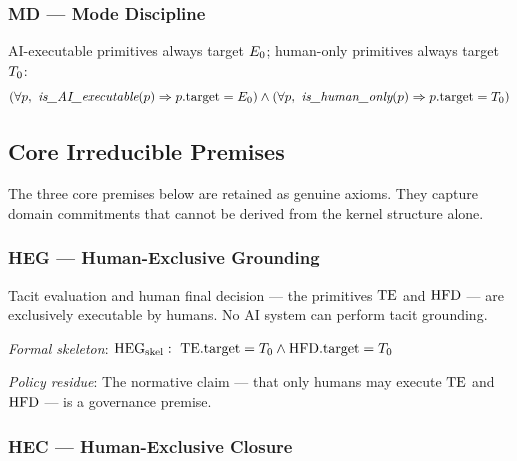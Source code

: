 \subsubsection*{MD --- Mode Discipline}

\begin{theorem}[MD is a theorem]
AI-executable primitives always target $E_0$; human-only primitives always
target $T_0$:
\[
  (\forall p,\ \textit{is\_AI\_executable}(p) \Rightarrow p.\mathrm{target} = E_0)
  \wedge
  (\forall p,\ \textit{is\_human\_only}(p) \Rightarrow p.\mathrm{target} = T_0)
\]
\end{theorem}

\subsection{Core Irreducible Premises}
\label{sec:core-irreducible}

The three core premises below are retained as genuine axioms. They capture
domain commitments that cannot be derived from the kernel structure alone.

\subsubsection*{HEG --- Human-Exclusive Grounding}

\begin{axiom_env}
Tacit evaluation and human final decision --- the primitives $\mathrm{TE}$ and $\mathrm{HFD}$ ---
are exclusively executable by humans. No AI system can perform tacit grounding.

\emph{Formal skeleton}:
$\mathrm{HEG}_{\mathrm{skel}}:\ \mathrm{TE}.\mathrm{target} = T_0 \wedge
\mathrm{HFD}.\mathrm{target} = T_0$


\emph{Policy residue}: The normative claim --- that only humans may execute
$\mathrm{TE}$ and $\mathrm{HFD}$ --- is a governance premise.
\end{axiom_env}

\subsubsection*{HEC --- Human-Exclusive Closure}

